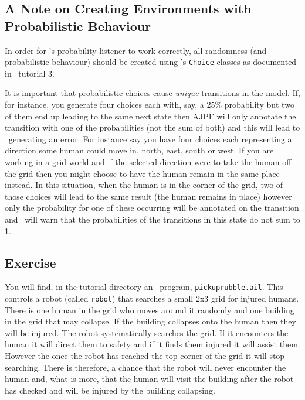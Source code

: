 \subsection{A Note on Creating Environments with Probabilistic Behaviour}

In order for \ajpf's probability listener to work correctly, all randomness (and probabilistic behaviour) should be created using \ail's \texttt{Choice} classes as documented in \ail\ tutorial 3.  

It is important that probabilistic choices cause \emph{unique} transitions in the model.  If, for instance, you generate four choices each with, say, a 25\% probability but two of them end up leading to the same next state then AJPF will only annotate the transition with one of the probabilities (not the sum of both) and this will lead to \prism\ generating an error.  For instance say you have four choices each representing a direction some human could move in, north, east, south or west.  If you are working in a grid world and if the selected direction were to take the human off the grid then you might choose to have the human remain in the same place instead.  In this situation, when the human is in the corner of the grid, two of those choices will lead to the same result (the human remains in place) however only the probability for one of these occurring will be annotated on the transition and \prism\ will warn that the probabilities of the transitions in this state do not sum to 1.

\subsection{Exercise}

You will find, in the tutorial directory an \ail\ program, \texttt{pickuprubble.ail}.  This controls a robot (called \texttt{robot}) that searches a small 2x3 grid for injured humans.  There is one human in the grid who moves around it randomly and one building in the grid that may collapse.  If the building collapses onto the human then they will be injured.  The robot systematically searches the grid.  If it encounters the human it will direct them to safety and if it finds them injured it will assist them.  However the once the robot has reached the top corner of the grid it will stop searching.  There is therefore, a chance that the robot will never encounter the human and, what is more, that the human will visit the building after the robot has checked and will be injured by the building collapsing.

